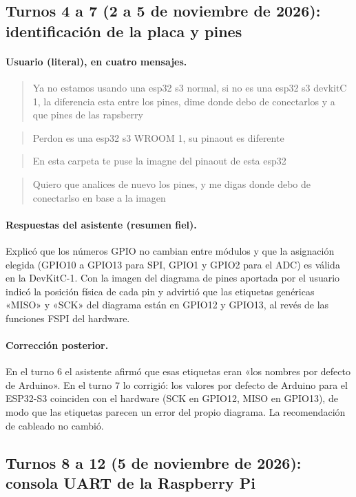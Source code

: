 \documentclass[12pt,a4paper]{article}
\begin{document}
\subsection{Turnos 4 a 7 (2 a 5 de noviembre de 2026): identificación de la placa y pines}

\paragraph{Usuario (literal), en cuatro mensajes.}
\begin{quote}
Ya no estamos usando una esp32 s3 normal, si no es una esp32 s3 devkitC 1, la diferencia esta entre los pines, dime donde debo de conectarlos y a que pines de las rapsberry
\end{quote}
\begin{quote}
Perdon es una esp32 s3 WROOM 1, su pinaout es diferente
\end{quote}
\begin{quote}
En esta carpeta te puse la imagne del pinaout de esta esp32
\end{quote}
\begin{quote}
Quiero que analices de nuevo los pines, y me digas donde debo de conectarlso en base a la imagen
\end{quote}

\paragraph{Respuestas del asistente (resumen fiel).} Explicó que los números GPIO no cambian entre módulos y que la asignación elegida (GPIO10 a GPIO13 para SPI, GPIO1 y GPIO2 para el ADC) es válida en la DevKitC-1. Con la imagen del diagrama de pines aportada por el usuario indicó la posición física de cada pin y advirtió que las etiquetas genéricas «MISO» y «SCK» del diagrama están en GPIO12 y GPIO13, al revés de las funciones FSPI del hardware.

\paragraph{Corrección posterior.} En el turno 6 el asistente afirmó que esas etiquetas eran «los nombres por defecto de Arduino». En el turno 7 lo corrigió: los valores por defecto de Arduino para el ESP32-S3 coinciden con el hardware (SCK en GPIO12, MISO en GPIO13), de modo que las etiquetas parecen un error del propio diagrama. La recomendación de cableado no cambió.

\subsection{Turnos 8 a 12 (5 de noviembre de 2026): consola UART de la Raspberry Pi}
\end{document}
